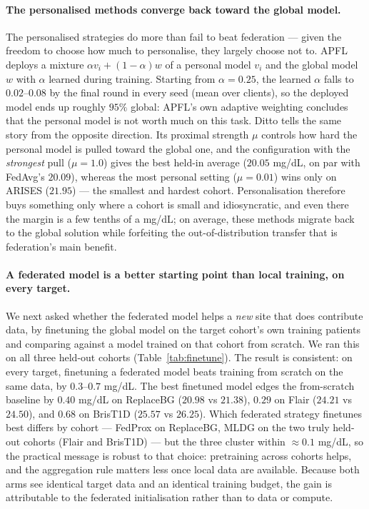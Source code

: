 \documentclass[10pt,letterpaper]{article}
\begin{document}
\paragraph{The personalised methods converge back toward the global model.} The
personalised strategies do more than fail to beat federation --- given the freedom
to choose how much to personalise, they largely choose not to. APFL deploys a
mixture $\alpha v_i + (1-\alpha) w$ of a personal model $v_i$ and the global model
$w$ with $\alpha$ learned during training. Starting from $\alpha = 0.25$, the
learned $\alpha$ falls to $0.02$--$0.08$ by the final round in every seed
(mean over clients), so the deployed model ends up roughly $95\%$ global: APFL's
own adaptive weighting concludes that the personal model is not worth much on this
task. Ditto tells the same story from the opposite direction. Its proximal
strength $\mu$ controls how hard the personal model is pulled toward the global
one, and the configuration with the \emph{strongest} pull ($\mu = 1.0$) gives the
best held-in average ($20.05$ mg/dL, on par with FedAvg's $20.09$), whereas the
most personal
setting ($\mu = 0.01$) wins only on ARISES ($21.95$) --- the smallest and hardest
cohort. Personalisation therefore buys something only where a cohort is small and
idiosyncratic, and even there the margin is a few tenths of a mg/dL; on average,
these methods migrate back to the global solution while forfeiting the
out-of-distribution transfer that is federation's main benefit.

\paragraph{A federated model is a better starting point than local training, on
every target.} We next asked whether the federated model helps a \emph{new} site
that does contribute data, by finetuning the global model on the target cohort's
own training patients and comparing against a model trained on that cohort from
scratch. We ran this on all three held-out cohorts (Table~\ref{tab:finetune}). The
result is consistent: on every target, finetuning a federated model beats training
from scratch on the same data, by $0.3$--$0.7$ mg/dL. The best finetuned model
edges the from-scratch baseline by $0.40$ mg/dL on ReplaceBG
($20.98$ vs $21.38$), $0.29$ on Flair ($24.21$ vs $24.50$), and $0.68$ on BrisT1D
($25.57$ vs $26.25$). Which federated strategy finetunes best differs by cohort
--- FedProx on ReplaceBG, MLDG on the two truly held-out cohorts (Flair and
BrisT1D) --- but the three cluster within $\approx 0.1$ mg/dL, so the practical
message is robust to that choice: pretraining across cohorts helps, and the
aggregation rule matters less once local data are available. Because both arms see
identical target data and an identical training budget, the gain is attributable
to the federated initialisation rather than to data or compute.
\end{document}
